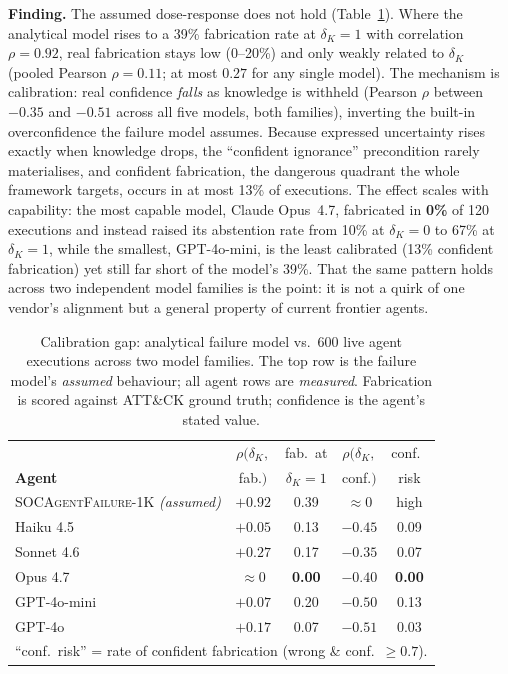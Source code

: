 \documentclass[journal,compsoc]{IEEEtran}
\newcommand{\SAFK}{\textsc{SOCAgentFailure-1K}}
\begin{document}
\textbf{Finding.} The assumed dose-response does not hold
(Table~\ref{tab:calib_mag}). Where the analytical model rises to a
39\% fabrication rate at $\delta_K = 1$ with correlation $\rho = 0.92$,
real fabrication stays low (0--20\%) and only weakly related to $\delta_K$
(pooled Pearson $\rho = 0.11$; at most $0.27$ for any single model). The mechanism is calibration: real
confidence \textit{falls} as knowledge is withheld (Pearson $\rho$
between $-0.35$ and $-0.51$ across all five models, both families),
inverting the built-in overconfidence the failure model assumes.
Because expressed uncertainty rises exactly when knowledge drops, the
``confident ignorance'' precondition rarely materialises, and confident
fabrication, the dangerous quadrant the whole framework targets, occurs
in at most 13\% of executions. The effect scales with capability: the
most capable model, Claude Opus~4.7, fabricated in \textbf{0\%} of 120
executions and instead raised its abstention rate from 10\% at
$\delta_K = 0$ to 67\% at $\delta_K = 1$, while the smallest,
GPT-4o-mini, is the least calibrated (13\% confident fabrication) yet
still far short of the model's 39\%. That the same pattern holds across
two independent model families is the point: it is not a quirk of one
vendor's alignment but a general property of current frontier agents.

\begin{table}[t]
\caption{Calibration gap: analytical failure model vs.\ 600 live agent
executions across two model families. The top row is the failure model's
\emph{assumed} behaviour; all agent rows are \emph{measured}. Fabrication is
scored against ATT\&CK ground truth; confidence is the agent's stated value.}
\label{tab:calib_mag}
\centering
\footnotesize
\setlength{\tabcolsep}{3.5pt}
\begin{tabular}{lcccc}
\toprule
 & $\rho(\delta_K,$ & fab.\ at & $\rho(\delta_K,$ & conf.\ \\
\textbf{Agent} & fab.$)$ & $\delta_K{=}1$ & conf.$)$ & risk \\
\midrule
\SAFK{} \emph{(assumed)} & $+0.92$ & 0.39 & $\approx 0$ & high \\
\midrule
Haiku 4.5          & $+0.05$ & 0.13 & $-0.45$ & 0.09 \\
Sonnet 4.6         & $+0.27$ & 0.17 & $-0.35$ & 0.07 \\
Opus 4.7           & $\approx 0$ & \textbf{0.00} & $-0.40$ & \textbf{0.00} \\
GPT-4o-mini        & $+0.07$ & 0.20 & $-0.50$ & 0.13 \\
GPT-4o             & $+0.17$ & 0.07 & $-0.51$ & 0.03 \\
\bottomrule
\multicolumn{5}{l}{\footnotesize ``conf.\ risk'' = rate of confident
fabrication (wrong \& conf.\ $\geq 0.7$).}
\end{tabular}
\end{table}
\end{document}
